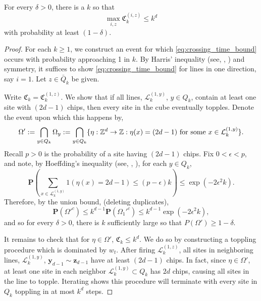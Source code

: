 \documentclass[12pt]{amsart}
\begin{document}
\begin{prop} \label{prop:crossing_time}
	For every $\delta > 0$, there is a $k$ so that  
	\begin{equation} \label{eq:crossing_time_bound}
	\max_{i,z} \mathfrak{C}_{k}^{(i,z)} \leq k^d
	\end{equation}
	with probability at least $(1-\delta)$. 
\end{prop}
\begin{proof}
	For each $k \geq 1$, we construct an event for which \eqref{eq:crossing_time_bound} occurs 
	with probability approaching 1 in $k$.  By Harris' inequality (see, \eg, \cite{alon2016probabilistic}) and symmetry,
	it suffices to show \eqref{eq:crossing_time_bound} for lines in one direction, say $i=1$.
	Let $z \in \bar{Q}_k$ be given. 
	
	Write $\mathfrak{C}_k =  \mathfrak{C}_k^{(1,z)}$.  We show that if all lines, $\mathcal{L}_k^{(1,y)}$, $y \in Q_k$, contain at least one 
	site with $(2 d - 1)$ chips, then every site in the cube eventually topples.  Denote the event upon which this happens by, 
	\begin{equation}
	\Omega' := \bigcap_{y \in Q_k} \Omega_y := \bigcap_{y \in Q_k} \{\eta:\mathbb{Z}^d \to \mathbb{Z} : \eta(x) = (2 d-1) \mbox{ for some $x \in \mathcal{L}_k^{(1,y)}$} \}.
	\end{equation}
	Recall $p > 0$ is the probability of a site having $(2 d-1)$ chips. Fix $0 < \epsilon < p$, and note, by Hoeffding's inequality (see, \eg, \cite{alon2016probabilistic}), 
	for each $y \in Q_k$, 
	\[
	\mathbf{P}( \sum_{ x \in \mathcal{L}_k^{(1,y)} }  1(\eta(x) = 2 d -1) \leq (p-\epsilon) k) \leq  \exp(-2 \epsilon^2 k).
	\]
	Therefore, by the union bound, (deleting duplicates),
	\[
	\mathbf{P}(\Omega'^c) \leq k^{d-1} \mathbf{P}(\Omega_1'^c) \leq k^{d-1} \exp(-2 \epsilon^2 k),
	\]
	and so for every $\delta > 0$, there is $k$ sufficiently large so that 
	$P(\Omega') \geq 1 - \delta$.
	
	It remains to check that for $\eta \in \Omega'$, $\mathfrak{C}_k \leq k^d$. We do so by constructing a toppling procedure which is dominated by $w_t$. After firing $\mathcal{L}_k^{(1,z)}$, all sites in neighboring lines, $\mathcal{L}_k^{(1,y)}$, $\mathbf{y}_{d-1} \sim \mathbf{z}_{d-1}$ have at least $(2 d - 1)$ chips. In fact, since $\eta \in \Omega'$, at least one site in each neighbor 
	$\mathcal{L}_k^{(1,y)} \subset Q_k$ has $2 d $ chips, causing all sites in the line to topple. Iterating shows this procedure will terminate with every site in $Q_k$ toppling in at most $k^{d}$ steps. 
	
\end{proof}
\end{document}
